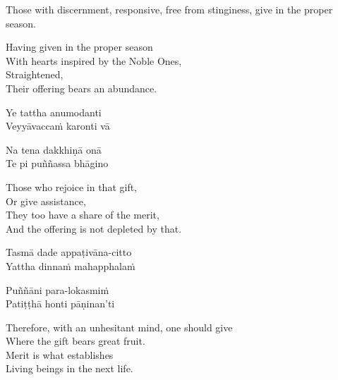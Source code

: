 \vspace{16pt}

\begin{english-verses}
  \begin{english-hangtogether}
    Those with discernment, responsive, free from stinginess, give in the proper season.
  \end{english-hangtogether}
  Having given in the proper season\\
  With hearts inspired by the Noble Ones,\\
  Straightened,\\
  Their offering bears an abundance.
\end{english-verses}

\begin{pali-hang}
  Ye tattha anumodanti\\
  Veyyāvaccaṁ karonti vā
\end{pali-hang}
\begin{pali-hangtogether}
  Na tena dakkhiṇā onā\\
  Te pi puññassa bhāgino
\end{pali-hangtogether}

\begin{english-verses}
  Those who rejoice in that gift,\\
  Or give assistance,\\
  They too have a share of the merit,\\
  And the offering is not depleted by that.
\end{english-verses}

\begin{pali-hang}
  Tasmā dade appaṭivāna-citto\\
  Yattha dinnaṁ mahapphalaṁ
\end{pali-hang}
\begin{pali-hangtogether}
  Puññāni para-lokasmiṁ\\
  Patiṭṭhā honti pāṇinan'ti
\end{pali-hangtogether}

\begin{english-verses}
  Therefore, with an unhesitant mind, one should give\\
  Where the gift bears great fruit.\\
  Merit is what establishes\\
  Living beings in the next life.
\end{english-verses}

